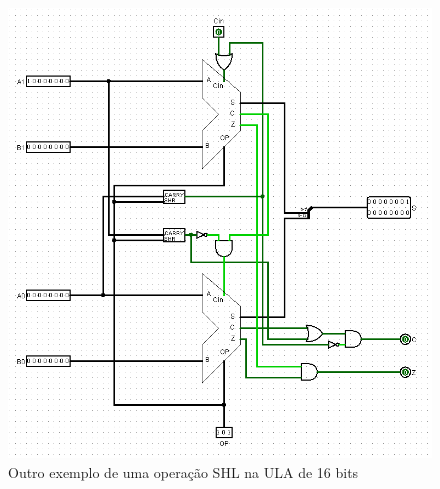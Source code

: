 \documentclass[
	12pt,				%
	openright,			%
	twoside,			%
	a4paper,			%
	english,			%
	french,				%
	spanish,			%
	brazil,				%
	]{abntex2}
\begin{document}
\begin{apendicesenv}
\begin{itemize}
\begin{figure}[p]
	\begin{center}
	    \includegraphics[scale=0.55]{imagens/ULA16SHL_2.png}
	\end{center}
\caption{\label{ula16shl2}Outro exemplo de uma operação SHL na ULA de 16 bits}
\end{figure}


\end{itemize}
\end{apendicesenv}
\end{document}
